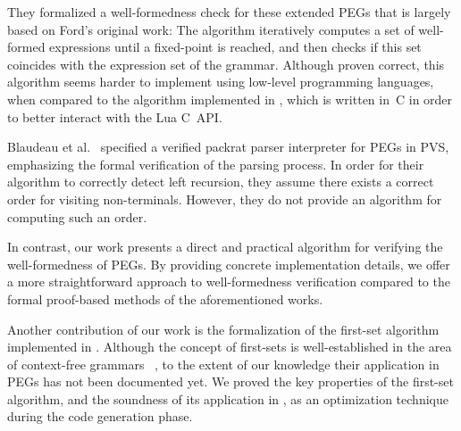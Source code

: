 They formalized a well-formedness check for these extended PEGs
that is largely based on Ford's original work:
The algorithm iteratively computes
a set of well-formed expressions
until a fixed-point is reached,
and then checks if this set
coincides with the expression set of the grammar.
Although proven correct,
this algorithm seems harder to implement
using low-level programming languages,
when compared to the algorithm implemented in \lpeg{},
which is written in~C in order to better interact with the Lua C~API.

Blaudeau et al.~\cite{blaudeau_verified_2020} specified
a verified packrat parser interpreter for PEGs in PVS,
emphasizing the formal verification of the parsing process.
In order for their algorithm to correctly detect left recursion,
they assume there exists a correct order for visiting non-terminals.
However, they do not provide an algorithm for computing such an order.

In contrast, our work presents a direct and practical algorithm
for verifying the well-formedness of PEGs.
By providing concrete implementation details,
we offer a more straightforward approach
to well-formedness verification compared
to the formal proof-based methods of the aforementioned works.

Another contribution of our work
is the formalization of the first-set algorithm implemented in \lpeg{}.
Although the concept of first-sets is well-established
in the area of context-free grammars~%
\cite{chomsky_three_1956},
to the extent of our knowledge
their application in PEGs has not been documented yet.
We proved the key properties of the first-set algorithm,
and the soundness of its application in \lpeg{},
as an optimization technique
during the code generation phase.
